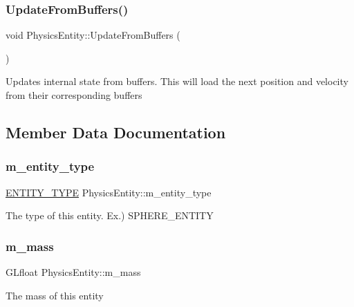 \subsubsection{\texorpdfstring{Update\+From\+Buffers()}{UpdateFromBuffers()}}
{\footnotesize\ttfamily void Physics\+Entity\+::\+Update\+From\+Buffers (\begin{DoxyParamCaption}{ }\end{DoxyParamCaption})}

Updates internal state from buffers. This will load the next position and velocity from their corresponding buffers 

\subsection{Member Data Documentation}
\mbox{\label{classPhysicsEntity_a71e8887fb5fd67e84b39d99dae634daf}} 
\subsubsection{\texorpdfstring{m\+\_\+entity\+\_\+type}{m\_entity\_type}}
{\footnotesize\ttfamily \hyperlink{classPhysicsEntity_a171840d3fef1fc21c3f922b240e03538}{E\+N\+T\+I\+T\+Y\+\_\+\+T\+Y\+PE} Physics\+Entity\+::m\+\_\+entity\+\_\+type\hspace{0.3cm}{\ttfamily [protected]}}

The type of this entity. Ex.) S\+P\+H\+E\+R\+E\+\_\+\+E\+N\+T\+I\+TY \mbox{\label{classPhysicsEntity_a5a7bc5174169e169f69723d2483c2eff}} 
\subsubsection{\texorpdfstring{m\+\_\+mass}{m\_mass}}
{\footnotesize\ttfamily G\+Lfloat Physics\+Entity\+::m\+\_\+mass\hspace{0.3cm}{\ttfamily [protected]}}

The mass of this entity \mbox{\label{classPhysicsEntity_abc38c58fd803d67079f25043331f0018}} 

